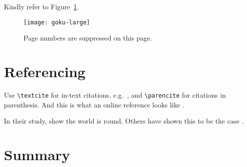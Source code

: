 Kindly refer to Figure~\ref{fig:largegoku}. 

\blindtext

\begin{figure}[!ht]
	\centering
	\texttt{[image: goku-large]}
	\caption[Short Random Caption]{Page numbers are suppressed on this page.}
	\label{fig:largegoku}
\end{figure}

\blindtext
\FloatBarrier %

\section{Referencing}

Use \texttt{\textbackslash textcite} for in-text citations, e.g.\ \textcite{Einstein1905}, and \texttt{\textbackslash parencite} for citations in parenthesis. And this is what an online reference looks like \parencite{WinNT}.

In their study, \textcite{Einstein1905} show the world is round. Others have shown this to be the case \parencite{Arrighi2003, Ebejer2016}.

\section{Summary}
\blindtext